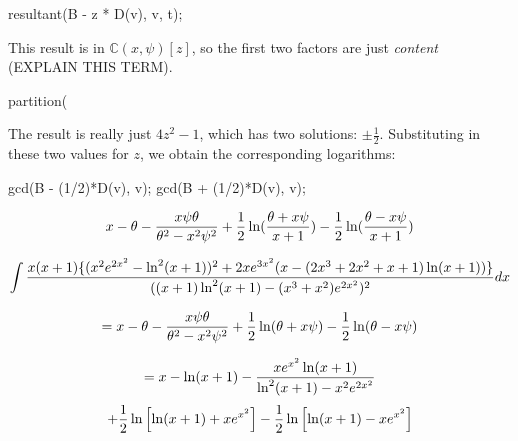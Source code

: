 \begin{maximacode}
resultant(B - z * D(v), v, t);
\end{maximacode}

This result is in ${\mathbb C}(x,\psi)[z]$, so the first two factors are just
{\it content} (EXPLAIN THIS TERM).

\begin{maximacode}
partition(%
\end{maximacode}

The result is really just $4z^2-1$,
which has two solutions: $\pm\frac{1}{2}$.  Substituting in these two
values for $z$, we obtain the corresponding logarithms:

\begin{maximacode}
gcd(B - (1/2)*D(v), v);
gcd(B + (1/2)*D(v), v);
\end{maximacode}


{\LARGE$$x - \theta - {x\psi\theta\over{\theta^2-x^2\psi^2}} + {1\over2}\ln({{\theta + x \psi}\over{x+1}}) - {1\over2}\ln({{\theta - x \psi}\over{x+1}})$$}


$$\int{{x(x+1)\{(x^2e^{2x^2}-\ln^2(x+1))^2+2xe^{3x^2}(x-(2x^3+2x^2+x+1)\ln(x+1))\}}\over{((x+1)\ln^2(x+1) - (x^3+x^2)e^{2x^2})^2}} dx$$

{\LARGE$$= x - \theta - {x\psi\theta\over{\theta^2-x^2\psi^2}} + {1\over2}\ln(\theta + x \psi) - {1\over2}\ln(\theta - x \psi)$$}

$$= x - \ln(x+1) - {x e^{x^2}\ln(x+1)\over{\ln^2(x+1)-x^2 e^{2x^2}}}$$
$$+ {1\over2}\ln\left[\ln(x+1) + x e^{x^2}\right] - {1\over2}\ln\left[\ln(x+1) - x e^{x^2}\right]$$

\endexample
